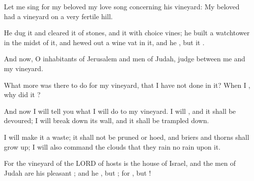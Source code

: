 \documentclass[11pt]{article}
\begin{document}
\begin{biblicaloutline}[Isaiah 5:1-7 (A)]
    

    \begin{versesection}{2em}
         Let me sing for my beloved
        \poetryline my love song concerning his vineyard:
        My beloved had a vineyard
        \poetryline on a very fertile hill.
        
         He dug it and cleared it of stones,
        \poetryline and  it with choice vines;
        he built a watchtower in the midst of it,
        \poetryline and hewed out a wine vat in it,
        and he ,
        \poetryline but it .
    \end{versesection}
    
    
    \begin{versesection}{2em}
         And now, O inhabitants of Jerusalem
        \poetryline and men of Judah,
        judge between me and my vineyard.
        
         What more was there to do for my vineyard,
        \poetryline that I have not done in it?
        When I ,
        \poetryline why did it ?
    \end{versesection}
    
    
    \begin{versesection}{2em}
         And now I will tell you
        \poetryline what I will do to my vineyard.
        I will ,
        \poetryline and it shall be devoured;
        I will break down its wall,
        \poetryline and it shall be trampled down.
        
         I will make it a waste;
        \poetryline it shall not be pruned or hoed,
        \poetryline and briers and thorns shall grow up;
        I will also command the clouds
        \poetryline that they rain no rain upon it.
    \end{versesection}
    
    
    \begin{versesection}{2em}
         For the vineyard of the LORD of hosts
        \poetryline is the house of Israel,
        and the men of Judah
        \poetryline are his pleasant ;
        and he  ,
        \poetryline but ;
        for ,
        \poetryline but !
    \end{versesection}

\end{biblicaloutline}
\end{document}
